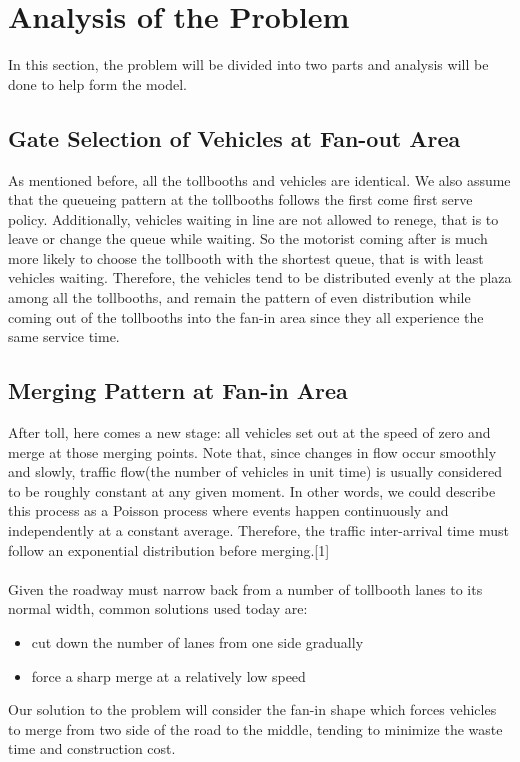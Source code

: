 \section{Analysis of the Problem}
In this section, the problem will be divided into two parts and analysis will be done to help form the model.

\subsection{Gate Selection of Vehicles at Fan-out Area}
As mentioned before, all the tollbooths and vehicles are identical. We also assume that the queueing pattern at the tollbooths follows the first come first serve policy. Additionally, vehicles waiting in line are not allowed to renege, that is to leave or change the queue while waiting. So the motorist coming after is much more likely to choose the tollbooth with the shortest queue, that is with least vehicles waiting. Therefore, the vehicles tend to be distributed evenly at the plaza among all the tollbooths, and remain the pattern of even distribution while coming out of the tollbooths into the fan-in area since they all experience the same service time.

\subsection{Merging Pattern at Fan-in Area}
After toll, here comes a new stage: all vehicles set out at the speed of zero and merge at those merging points. Note that, since changes in flow occur smoothly and slowly, traffic flow(the number of vehicles in unit time) is usually considered to be roughly constant at any given moment. In other words, we could describe this process as a Poisson process where events happen continuously and independently at a constant average. Therefore, the traffic inter-arrival time must follow an exponential distribution before merging.[1]\\
\\
Given the roadway must narrow back from a number of tollbooth lanes to its normal width, common solutions used today are: 
\begin{itemize}
\item cut down the number of lanes from one side gradually
\item force a sharp merge at a relatively low speed
\end{itemize}
\noindent
Our solution to the problem will consider the fan-in shape which forces vehicles to merge from two side of the road to the middle, tending to minimize the waste time and construction cost.

